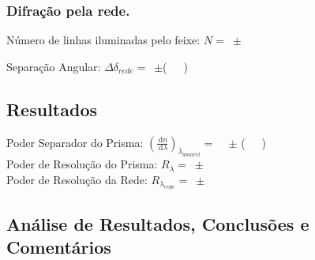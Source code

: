 \documentclass[a4paper,12pt]{article}  %
\newcommand{\ud}{\,\mathrm{d}}
\begin{document}
\subsubsection{Difração pela rede.
}\label{subsec:difrac}

\noindent Número de linhas iluminadas pelo feixe:  $N=$~\underline{\makebox[1.5cm][r]{~}}$\pm$\underline{\makebox[1cm][r]{~}}

\noindent Separação Angular:  
$\Delta\delta_{rede}= $~\underline{\makebox[1.5cm][r]{~}}$\pm$\underline{\makebox[1cm][r]{~}}(~~~) 



\subsection{\sf Resultados}

\noindent Poder Separador do Prisma: $\left( \frac{\ud n}{\ud \lambda } \right)_{\overline{\lambda}_{amarel}}=$ ~\underline{\makebox[1.5cm][r]{~}} $\pm$ \underline{\makebox[1cm][r]{~}}(~~~)
\\
\noindent Poder de Resolução do Prisma:  $R_{\lambda} = $~\underline{\makebox[1.5cm][r]{~}}$\pm$\underline{\makebox[1cm][r]{~}}
\\
\noindent Poder de Resolução da Rede:  $R_{\lambda_{rede}} = $~\underline{\makebox[1.5cm][r]{~}}$\pm$\underline{\makebox[1cm][r]{~}}


\subsection{\sf Análise de Resultados, Conclusões e Comentários}
\noindent\underline{\makebox[\textwidth][r]{~}} \\
\noindent\underline{\makebox[\textwidth][r]{~}} \\
\noindent\underline{\makebox[\textwidth][r]{~}} \\
\noindent\underline{\makebox[\textwidth][r]{~}} \\
\noindent\underline{\makebox[\textwidth][r]{~}} \\
\noindent\underline{\makebox[\textwidth][r]{~}} \\
\noindent\underline{\makebox[\textwidth][r]{~}} \\
\noindent\underline{\makebox[\textwidth][r]{~}} \\
\noindent\underline{\makebox[\textwidth][r]{~}} \\
\noindent\underline{\makebox[\textwidth][r]{~}} \\
\noindent\underline{\makebox[\textwidth][r]{~}} \\
\noindent\underline{\makebox[\textwidth][r]{~}} \\
\noindent\underline{\makebox[\textwidth][r]{~}} \\
\noindent\underline{\makebox[\textwidth][r]{~}} \\
\noindent\underline{\makebox[\textwidth][r]{~}} \\




\end{document}

